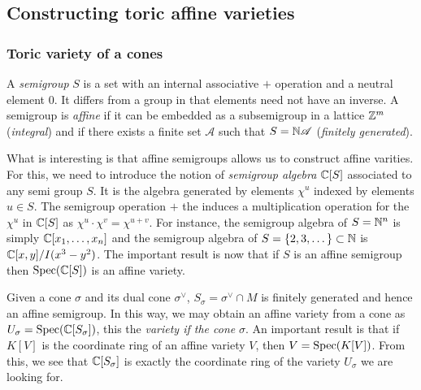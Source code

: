     \subsection{Constructing toric affine varieties}
    
        \subsubsection{Toric variety of a cones}

            A \emph{semigroup} $S$ is a set with an internal associative $+$ operation and a neutral element $0$. It differs from a group in that elements need not have an inverse. A semigroup is \emph{affine} if it can be embedded as a subsemigroup in a lattice $\mathbb{Z}^m$ (\emph{integral}) and if there exists a finite set $\mathscr{A}$ such that $S=\mathbb{N}\mathscr{A}$ (\emph{finitely generated}). 
                
            What is interesting is that affine semigroups allows us to construct affine varities. For this, we need to introduce the notion of \emph{semigroup algebra} $\mathbb{C}[S]$ associated to any semi group $S$. It is the algebra generated by elements $\chi^u$ indexed by elements $u\in S$. The semigroup operation $+$ the induces a multiplication operation for the $\chi^u$ in $\mathbb{C}[S]$ as $\chi^u\cdot\chi^v=\chi^{u+v}$. For instance, the semigroup algebra of $S=\mathbb{N}^n$ is simply $\mathbb{C}[x_1,\dots,x_n]$ and the semigroup algebra of $S=\{2,3,\dots\}\subset\mathbb{N}$ is $\mathbb{C}[x,y]/I(x^3-y^2)$. The important result is now that if $S$ is an affine semigroup then $\text{Spec}(\mathbb{C}[S])$ is an affine variety.

            Given a cone $\sigma$ and its dual cone $\sigma^\vee$, $S_\sigma=\sigma^\vee\cap M$ is finitely generated and hence an affine semigroup. In this way, we may obtain an affine variety from a cone as $U_\sigma=\text{Spec}(\mathbb{C}[S_\sigma])$, this the \emph{variety if the cone} $\sigma$. An important result is that if $K[V]$ is the coordinate ring of an affine variety $V$, then $V=\text{Spec}(K[V])$. From this, we see that $\mathbb{C}[S_\sigma]$ is exactly the coordinate ring of the variety $U_\sigma$ we are looking for.
            
